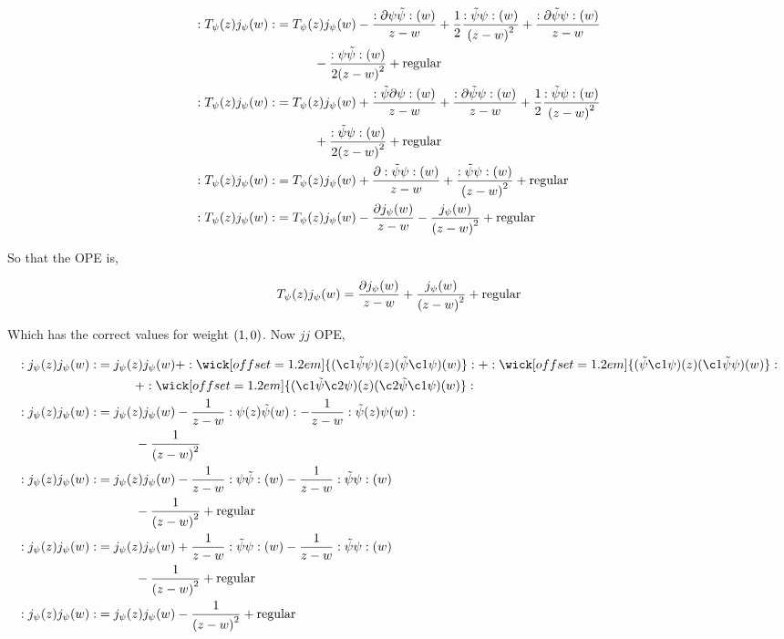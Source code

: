 \begin{align*}
    :T_\psi\qty(z)j_\psi\qty(w):&=T_\psi\qty(z)j_\psi\qty(w)-\frac{:\partial\psi\tilde\psi:\qty(w)}{z-w}+\frac12\frac{:\tilde\psi\psi:\qty(w)}{\qty(z-w)^2}+\frac{:\partial\tilde\psi\psi:\qty(w)}{z-w}\\
    &\quad\quad\quad-\frac{:\psi\tilde\psi:\qty(w)}{2\qty(z-w)^2}+\textnormal{regular}\\
    :T_\psi\qty(z)j_\psi\qty(w):&=T_\psi\qty(z)j_\psi\qty(w)+\frac{:\tilde\psi\partial\psi:\qty(w)}{z-w}+\frac{:\partial\tilde\psi\psi:\qty(w)}{z-w}+\frac12\frac{:\tilde\psi\psi:\qty(w)}{\qty(z-w)^2}\\
    &\quad\quad\quad+\frac{:\tilde\psi\psi:\qty(w)}{2\qty(z-w)^2}+\textnormal{regular}\\
    :T_\psi\qty(z)j_\psi\qty(w):&=T_\psi\qty(z)j_\psi\qty(w)+\frac{\partial:\tilde\psi\psi:\qty(w)}{z-w}+\frac{:\tilde\psi\psi:\qty(w)}{\qty(z-w)^2}+\textnormal{regular}\\
    :T_\psi\qty(z)j_\psi\qty(w):&=T_\psi\qty(z)j_\psi\qty(w)-\frac{\partial j_\psi\qty(w)}{z-w}-\frac{j_\psi\qty(w)}{\qty(z-w)^2}+\textnormal{regular}
\end{align*}

So that the OPE is,

\begin{align*}
    T_\psi\qty(z)j_\psi\qty(w)=\frac{\partial j_\psi\qty(w)}{z-w}+\frac{j_\psi\qty(w)}{\qty(z-w)^2}+\textnormal{regular}
\end{align*}

Which has the correct values for weight $\qty(1,0)$. Now $jj$ OPE,

\begin{align*}
    \cnord{j_\psi\qty(z)j_\psi\qty(w)}&=j_\psi\qty(z)j_\psi\qty(w)+\cnord{\wick[offset=1.2em]{(\c1{\tilde\psi}\psi)\qty(z)(\tilde\psi\c1\psi)\qty(w)}}+\cnord{\wick[offset=1.2em]{({\tilde\psi}\c1\psi)\qty(z)(\c1{\tilde\psi}\psi)\qty(w)}}\\
    &\quad\quad\quad+\cnord{\wick[offset=1.2em]{(\c1{\tilde\psi}\c2\psi)\qty(z)(\c2{\tilde\psi}\c1\psi)\qty(w)}}\\
    \cnord{j_\psi\qty(z)j_\psi\qty(w)}&=j_\psi\qty(z)j_\psi\qty(w)-\frac{1}{z-w}\cnord{\psi\qty(z)\tilde\psi\qty(w)}-\frac{1}{z-w}\cnord{\tilde\psi\qty(z)\psi\qty(w)}\\
    &\quad\quad\quad-\frac{1}{\qty(z-w)^2}\\
    \cnord{j_\psi\qty(z)j_\psi\qty(w)}&=j_\psi\qty(z)j_\psi\qty(w)-\frac{1}{z-w}\cnord{\psi\tilde\psi}\qty(w)-\frac{1}{z-w}\cnord{\tilde\psi\psi}\qty(w)\\
    &\quad\quad\quad-\frac{1}{\qty(z-w)^2}+\textnormal{regular}\\
    \cnord{j_\psi\qty(z)j_\psi\qty(w)}&=j_\psi\qty(z)j_\psi\qty(w)+\frac{1}{z-w}\cnord{\tilde\psi\psi}\qty(w)-\frac{1}{z-w}\cnord{\tilde\psi\psi}\qty(w)\\
    &\quad\quad\quad-\frac{1}{\qty(z-w)^2}+\textnormal{regular}\\
    \cnord{j_\psi\qty(z)j_\psi\qty(w)}&=j_\psi\qty(z)j_\psi\qty(w)-\frac{1}{\qty(z-w)^2}+\textnormal{regular}
\end{align*}

